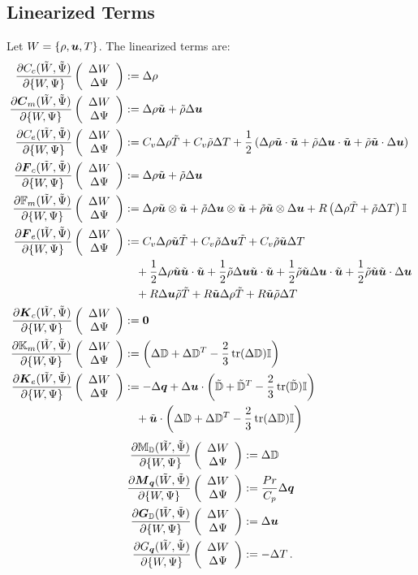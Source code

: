 \documentclass[Dissertation.tex]{subfiles}
\begin{document}
\subsection{Linearized Terms}
Let $W=\LRc{\rho,\bfu,T}$.
The linearized terms are:
\begin{align*}
\pd{C_c(\tilde W,\tilde\Psi)}{\{W,\Psi\}}\vecttwo{\Delta W}{\Delta\Psi}&:=
	\Delta\rho\\
\pd{\bfC_m(\tilde W,\tilde\Psi)}{\{W,\Psi\}}\vecttwo{\Delta W}{\Delta\Psi}&:=
	\Delta\rho\tilde\bfu+\tilde\rho\Delta\bfu\\
\pd{C_e(\tilde W,\tilde\Psi)}{\{W,\Psi\}}\vecttwo{\Delta W}{\Delta\Psi}&:=
	C_v\Delta\rho\tilde T+C_v\tilde\rho\Delta T
	+\frac{1}{2}\LRp{\Delta\rho\tilde\bfu\cdot\tilde\bfu+\tilde\rho\Delta\bfu\cdot\tilde\bfu+\tilde\rho\tilde\bfu\cdot\Delta\bfu}\\
\pd{\bfF_c(\tilde W,\tilde\Psi)}{\{W,\Psi\}}\vecttwo{\Delta W}{\Delta\Psi}&:=
	\Delta\rho\tilde\bfu+\tilde\rho\Delta\bfu\\
\pd{\mathbb{F}_m(\tilde W,\tilde\Psi)}{\{W,\Psi\}}\vecttwo{\Delta W}{\Delta\Psi}&:=
	\Delta\rho\tilde\bfu\otimes\tilde\bfu
	+\tilde\rho\Delta\bfu\otimes\tilde\bfu
	+\tilde\rho\tilde\bfu\otimes\Delta\bfu
	+R\LRp{\Delta\rho\tilde T+\tilde\rho\Delta T}\bbI\\
\pd{\bfF_e(\tilde W,\tilde\Psi)}{\{W,\Psi\}}\vecttwo{\Delta W}{\Delta\Psi}&:=
	C_v\Delta\rho\tilde\bfu\tilde T+C_v\tilde\rho\Delta\bfu\tilde T+C_v\tilde\rho\tilde\bfu\Delta T
	\\&\quad
	+\frac{1}{2}\Delta\rho\tilde\bfu\tilde\bfu\cdot\tilde\bfu
	+\frac{1}{2}\tilde\rho\Delta\bfu\tilde\bfu\cdot\tilde\bfu
	+\frac{1}{2}\tilde\rho\tilde\bfu\Delta\bfu\cdot\tilde\bfu
	+\frac{1}{2}\tilde\rho\tilde\bfu\tilde\bfu\cdot\Delta\bfu
	\\&\quad
	+R\Delta\bfu\tilde\rho\tilde T
	+R\tilde\bfu\Delta\rho\tilde T
	+R\tilde\bfu\tilde\rho\Delta T\\
\pd{\bfK_c(\tilde W,\tilde\Psi)}{\{W,\Psi\}}\vecttwo{\Delta W}{\Delta\Psi}&:=
	\boldsymbol 0\\
\pd{\bbK_m(\tilde W,\tilde\Psi)}{\{W,\Psi\}}\vecttwo{\Delta W}{\Delta\Psi}&:=
	\LRp{\Delta\bbD+\Delta\bbD^T-\frac{2}{3}\trace(\Delta\bbD)\bbI}\\
\pd{\bfK_e(\tilde W,\tilde\Psi)}{\{W,\Psi\}}\vecttwo{\Delta W}{\Delta\Psi}&:=
	-\Delta\bfq+\Delta\bfu\cdot\LRp{\tilde\bbD+\tilde\bbD^T-\frac{2}{3}\trace(\tilde\bbD)\bbI}
	\\&\quad
	+\tilde\bfu\cdot\LRp{\Delta\bbD+\Delta\bbD^T-\frac{2}{3}\trace(\Delta\bbD)\bbI}\\
\end{align*}
\begin{align*}
\pd{\bbM_{\bbD}(\tilde W,\tilde\Psi)}{\{W,\Psi\}}\vecttwo{\Delta W}{\Delta\Psi}&:=
	\Delta\bbD\\
\pd{\bfM_{\bfq}(\tilde W,\tilde\Psi)}{\{W,\Psi\}}\vecttwo{\Delta W}{\Delta\Psi}&:=
	\frac{Pr}{C_p}\Delta\bfq\\
\pd{\bfG_{\bbD}(\tilde W,\tilde\Psi)}{\{W,\Psi\}}\vecttwo{\Delta W}{\Delta\Psi}&:=
	\Delta\bfu\\
\pd{G_{\bfq}(\tilde W,\tilde\Psi)}{\{W,\Psi\}}\vecttwo{\Delta W}{\Delta\Psi}&:=
	-\Delta T\,.
\end{align*}
\end{document}
